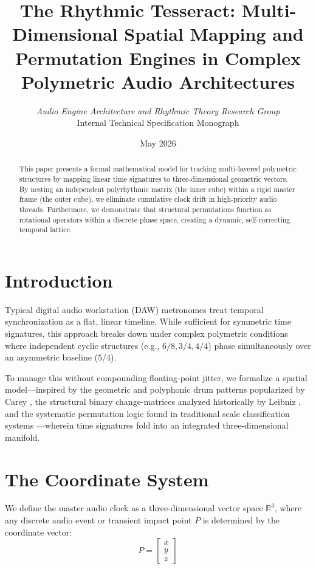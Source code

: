 \documentclass[11pt,twocolumn]{article}
\title{\textbf{The Rhythmic Tesseract: Multi-Dimensional Spatial Mapping and Permutation Engines in Complex Polymetric Audio Architectures}}
\author{\small\textit{Audio Engine Architecture and Rhythmic Theory Research Group} \\
\small Internal Technical Specification Monograph}
\date{May 2026}
\begin{document}
\maketitle

\begin{abstract}
This paper presents a formal mathematical model for tracking multi-layered polymetric structures by mapping linear time signatures to three-dimensional geometric vectors. By nesting an independent polyrhythmic matrix (the inner cube) within a rigid master frame (the outer cube), we eliminate cumulative clock drift in high-priority audio threads. Furthermore, we demonstrate that structural permutations function as rotational operators within a discrete phase space, creating a dynamic, self-correcting temporal lattice.
\end{abstract}

\section{Introduction}
Typical digital audio workstation (DAW) metronomes treat temporal synchronization as a flat, linear timeline. While sufficient for symmetric time signatures, this approach breaks down under complex polymetric conditions where independent cyclic structures (e.g., $6/8, 3/4, 4/4$) phase simultaneously over an asymmetric baseline ($5/4$). 

To manage this without compounding floating-point jitter, we formalize a spatial model—inspired by the geometric and polyphonic drum patterns popularized by Carey \cite{drumeo_carey}, the structural binary change-matrices analyzed historically by Leibniz \cite{leibniz_binary}, and the systematic permutation logic found in traditional scale classification systems \cite{venkatasubramanian_melakarta}—wherein time signatures fold into an integrated three-dimensional manifold.

\section{The Coordinate System}
We define the master audio clock as a three-dimensional vector space $\mathbb{R}^3$, where any discrete audio event or transient impact point $P$ is determined by the coordinate vector:
\begin{equation}
P = \begin{bmatrix} x \\ y \\ z \end{bmatrix}
\end{equation}
\end{document}
